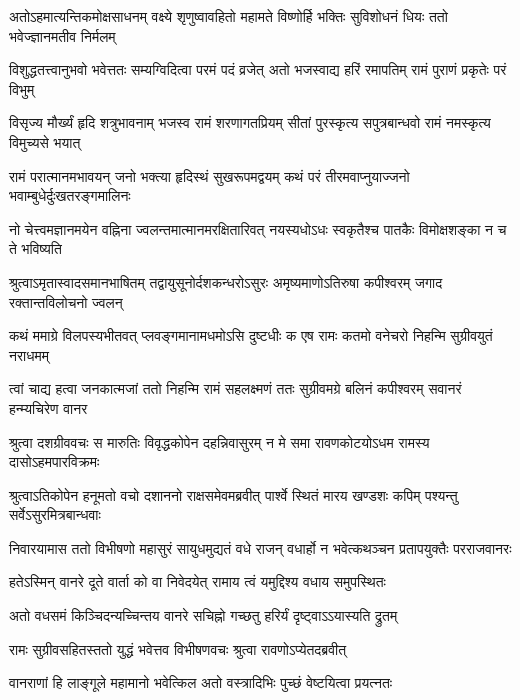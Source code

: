 \fourlineindentedshloka
{अतोऽहमात्यन्तिकमोक्षसाधनम्}
{वक्ष्ये शृणुष्वावहितो महामते} %
{विष्णोर्हि भक्तिः सुविशोधनं धियः}
{ततो भवेज्ज्ञानमतीव निर्मलम्}

\fourlineindentedshloka
{विशुद्धतत्त्वानुभवो भवेत्ततः}
{सम्यग्विदित्वा परमं पदं व्रजेत्} %
{अतो भजस्वाद्य हरिं रमापतिम्}
{रामं पुराणं प्रकृतेः परं विभुम्}

\fourlineindentedshloka
{विसृज्य मौर्ख्यं हृदि शत्रुभावनाम्}
{भजस्व रामं शरणागतप्रियम्}
{सीतां पुरस्कृत्य सपुत्रबान्धवो}
{रामं नमस्कृत्य विमुच्यसे भयात्} %

\fourlineindentedshloka
{रामं परात्मानमभावयन् जनो}
{भक्त्या हृदिस्थं सुखरूपमद्वयम्}
{कथं परं तीरमवाप्नुयाज्जनो}
{भवाम्बुधेर्दुःखतरङ्गमालिनः} %

\fourlineindentedshloka
{नो चेत्त्वमज्ञानमयेन वह्निना}
{ज्वलन्तमात्मानमरक्षितारिवत्}
{नयस्यधोऽधः स्वकृतैश्च पातकैः}
{विमोक्षशङ्का न च ते भविष्यति} %

\fourlineindentedshloka
{श्रुत्वाऽमृतास्वादसमानभाषितम्}
{तद्वायुसूनोर्दशकन्धरोऽसुरः}
{अमृष्यमाणोऽतिरुषा कपीश्वरम्}
{जगाद रक्तान्तविलोचनो ज्वलन्} %

\fourlineindentedshloka
{कथं ममाग्रे विलपस्यभीतवत्}
{प्लवङ्गमानामधमोऽसि दुष्टधीः}
{क एष रामः कतमो वनेचरो}
{निहन्मि सुग्रीवयुतं नराधमम्} %

\fourlineindentedshloka
{त्वां चाद्य हत्वा जनकात्मजां ततो}
{निहन्मि रामं सहलक्ष्मणं ततः}
{सुग्रीवमग्रे बलिनं कपीश्वरम्}
{सवानरं हन्म्यचिरेण वानर}


\fourlineindentedshloka
{श्रुत्वा दशग्रीववचः स मारुतिः}
{विवृद्धकोपेन दहन्निवासुरम्} %
{न मे समा रावणकोटयोऽधम}
{रामस्य दासोऽहमपारविक्रमः}

\fourlineindentedshloka
{श्रुत्वाऽतिकोपेन हनूमतो वचो}
{दशाननो राक्षसमेवमब्रवीत्} %
{पार्श्वे स्थितं मारय खण्डशः कपिम्}
{पश्यन्तु सर्वेऽसुरमित्रबान्धवाः}

\fourlineindentedshloka
{निवारयामास ततो विभीषणो}
{महासुरं सायुधमुद्यतं वधे}
{राजन् वधार्हो न भवेत्कथञ्चन}
{प्रतापयुक्तैः परराजवानरः} %

\twolineshloka
{हतेऽस्मिन् वानरे दूते वार्ता को वा निवेदयेत्}
{रामाय त्वं यमुद्दिश्य वधाय समुपस्थितः} %

\twolineshloka
{अतो वधसमं किञ्चिदन्यच्चिन्तय वानरे}
{सचिह्नो गच्छतु हरिर्यं दृष्ट्वाऽऽयास्यति द्रुतम्} %

\twolineshloka
{रामः सुग्रीवसहितस्ततो युद्धं भवेत्तव}
{विभीषणवचः श्रुत्वा रावणोऽप्येतदब्रवीत्} %

\twolineshloka
{वानराणां हि लाङ्गूले महामानो भवेत्किल}
{अतो वस्त्रादिभिः पुच्छं वेष्टयित्वा प्रयत्नतः} %

